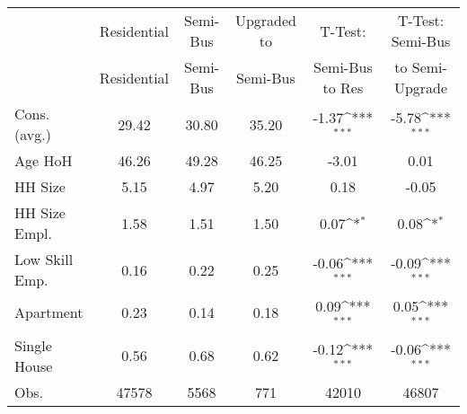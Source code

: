 {
\def\sym#1{\ifmmode^{#1}\else\(^{#1}\)\fi}
\begin{tabular}{l*{1}{ccccc}}
\hline\hline
                    & Residential&Semi-Bus&Upgraded to &T-Test:         &T-Test:    Semi-Bus   \\
                    & Residential&Semi-Bus&Semi-Bus &Semi-Bus to Res         & to Semi-Upgrade         \\
\hline
Cons. (avg.)        &       29.42&       30.80&       35.20&       -1.37\sym{***}&       -5.78\sym{***}\\
Age HoH             &       46.26&       49.28&       46.25&       -3.01         &        0.01         \\
HH Size             &        5.15&        4.97&        5.20&        0.18         &       -0.05         \\
HH Size Empl.       &        1.58&        1.51&        1.50&        0.07\sym{*}  &        0.08\sym{*}  \\
Low Skill Emp.      &        0.16&        0.22&        0.25&       -0.06\sym{***}&       -0.09\sym{***}\\
Apartment           &        0.23&        0.14&        0.18&        0.09\sym{***}&        0.05\sym{***}\\
Single House        &        0.56&        0.68&        0.62&       -0.12\sym{***}&       -0.06\sym{***}\\
Obs.                &    47578&     5568&      771&    42010         &    46807         \\
\hline\hline
\end{tabular}
}

